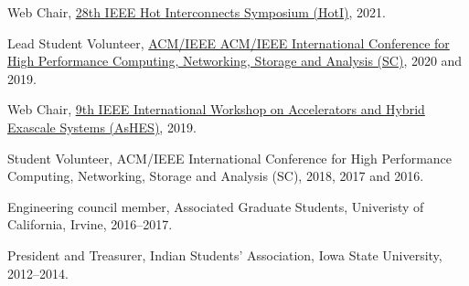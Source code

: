 \documentclass[11pt,article,oneside]{memoir}
\begin{document}
\ind Web Chair, \href{https://hoti.org/}{28th IEEE Hot Interconnects Symposium (HotI)}, 2021.

\ind Lead Student Volunteer, \href{https://sc20.supercomputing.org/2020/07/07/eighteen-sc20-lead-student-volunteers-announced/}{ACM/IEEE ACM/IEEE International Conference for High Performance Computing, Networking, Storage and Analysis (SC)}, 2020 and 2019.

\ind Web Chair, \href{https://www.mcs.anl.gov/events/workshops/ashes/2019/organizers.php}{9th IEEE International Workshop on Accelerators and Hybrid Exascale Systems (AsHES)}, 2019.

\ind Student Volunteer, ACM/IEEE International Conference for High Performance Computing, Networking, Storage and Analysis (SC), 2018, 2017 and 2016.

\medskip

\ind Engineering council member, Associated Graduate Students, Univeristy of California, Irvine, 2016--2017.

\ind President and Treasurer, Indian Students' Association, Iowa State University, 2012--2014.
\end{document}
